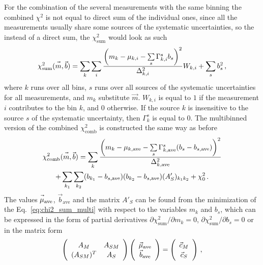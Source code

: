 For the combination of the several measurements with the same binning the combined $\chi^2$ is not equal to direct sum of the individual ones, since all the measurements usually share some sources of the systematic uncertainties, so the instead of a direct sum, the $\chi^2_\mathrm{sum}$ would look as such
\begin{equation}\label{eq:chi2_sum_multi}
\chi^2_\mathrm{sum}(\vec{\vphantom b\smash{m}},\vec{b}) = \sum\limits_k\sum\limits_i \frac{\left(m_k-\mu_{k,i} - \sum\limits_s \Gamma^s_{k,i} b_s\right)^2}{\Delta^2_{k,i}} W_{k,i}+\sum\limits_s b^2_s \,,
\end{equation}
where $k$ runs over all bins, $s$ runs over all sources of the systematic uncertainties for all measurements, and $m_k$ substitute $\vec{m}$. $W_{k,i}$ is equal to $1$ if the measurement $i$ contributes to the bin $k$, and $0$ otherwise. If the source $k$ is insensitive to the source $s$ of the systematic uncertainty, then $\Gamma^s_k$ is equal to $0$. The multibinned version of the combined $\chi^2_\mathrm{comb}$ is constructed the same way as before
\begin{equation}
\begin{gathered}
\chi^2_\mathrm{comb}(\vec{\vphantom b\smash{m}},\vec{b}) = \sum\limits_k\frac{\left(m_k-\mu_{k,\mathrm{ave}}-\sum\limits_s \Gamma^s_{k,\mathrm{ave}}(b_s - b_{s,\mathrm{ave}})\right)^2}{\Delta_{k,\mathrm{ave}}^2} \\
+ \sum\limits_{k_1} \sum\limits_{k_2} (b_{k_1} - b_{s,\mathrm{ave}})(b_{k_2} - b_{s,\mathrm{ave}})(A'_S)_{k_{1}k_{2}} + \chi^2_0\,.
\end{gathered}
\end{equation}
The values $\vec{\vphantom b\smash{\mu}}_\mathrm{ave}$, $\vec{b}_\mathrm{ave}$ and the matrix $A'_S$ can be found from the minimization of the Eq.~\ref{eq:chi2_sum_multi} with respect to the variables $m_k$ and $b_s$, which can be expressed in the form of partial derivatives $\partial\chi^2_\mathrm{sum}/\partial m_k = 0$, $\partial\chi^2_\mathrm{sum}/\partial b_s = 0$ or in the matrix form
\begin{equation}
\left( \begin{array}{cc} \vphantom{\vec{b}}  A_M & A_{SM} \\ \vphantom{\vec{b}}(A_{SM})^T & A_S \end{array} \right)
\left( \begin{array}{c}  \vphantom{\vec{b}}\vec{\mu}_\mathrm{ave} \\ \vec{b}_\mathrm{ave} \end{array} \right)
=
\left( \begin{array}{c} \vphantom{\vec{b}}\vec{c}_M \\ \vphantom{\vec{b}}\vec{c}_S \end{array} \right) \,,
\end{equation}
